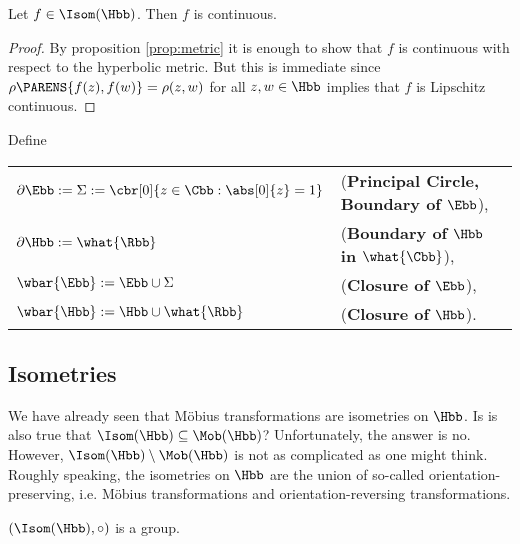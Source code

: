 \begin{proposition}
Let $f \in \Isom(\Hbb)$. Then $f$ is continuous.
\label{prop:continuous}
\end{proposition}

\begin{proof}
By proposition \ref{prop:metric} it is enough to show that $f$ is continuous with respect to the hyperbolic metric. But this is immediate since $\rho\PARENS{f(z),f(w)} = \rho(z,w)$ for all $z,w \in \Hbb$ implies that $f$ is Lipschitz continuous.
\end{proof}

\begin{definition}
	Define
		\begin{center}
		\begin{tabular}{ll}
			$\partial \Ebb := \Sigma := \cbr[0]{z \in \Cbb : \abs[0]{z} = 1}$ & (\textbf{Principal Circle, Boundary of $\Ebb$}),\\
			$\partial \Hbb := \what{\Rbb}$ & (\textbf{Boundary of $\Hbb$ in $\what{\Cbb}$}),\\
			$\wbar{\Ebb} := \Ebb \cup \Sigma$ & (\textbf{Closure of $\Ebb$}),\\
			$\wbar{\Hbb} := \Hbb \cup \what{\Rbb}$ & (\textbf{Closure of $\Hbb$}).\\
		\end{tabular}
	\end{center}
\end{definition}

\subsection{Isometries}
We have already seen that M\"obius transformations are isometries on $\Hbb$. Is is also true that $\Isom(\Hbb) \subseteq \Mob(\Hbb)$? Unfortunately, the answer is no. However, $\Isom(\Hbb) \setminus \Mob(\Hbb)$ is not as complicated as one might think. Roughly speaking, the isometries on $\Hbb$ are the union of so-called orientation-preserving, i.e. M\"obius transformations and orientation-reversing transformations.

\begin{proposition}
	$(\Isom(\Hbb),\circ)$ is a group.
\end{proposition}

